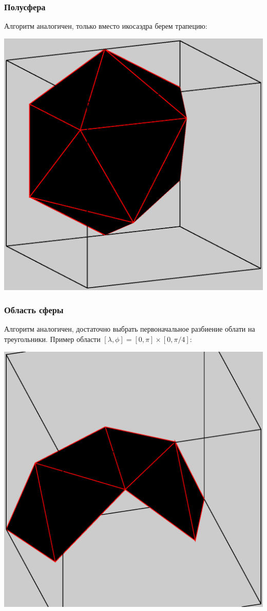 \documentclass[a4paper,article]{article}
\begin{document}
\subsubsection{Полусфера}
Алгоритм аналогичен, только вместо икосаэдра берем трапецию:

\includegraphics[scale=0.5]{hemisphere.eps}

\subsubsection{Область сферы}
Алгоритм аналогичен, достаточно выбрать первоначальное разбиение облати на треугольники.
Пример области $[\lambda,\phi]=[0,\pi]\times[0,\pi/4]$:

\includegraphics[scale=0.5]{test.eps}
\end{document}
